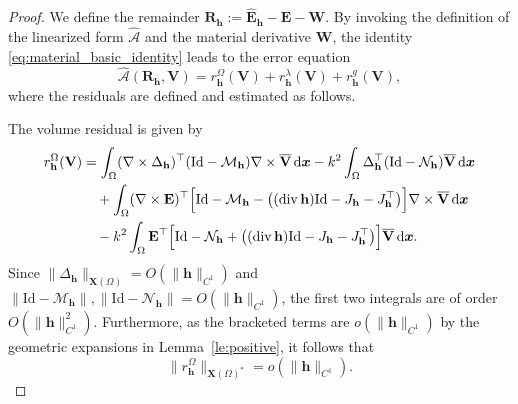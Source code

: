 \documentclass[12pt,reqno]{amsart}
\theoremstyle{definition}
\numberwithin{equation}{section}
\begin{document}
\begin{proof}
We define the remainder $\mathbf{R}_{\mathbf{h}} := \hat{\mathbf{E}}_{\mathbf{h}} - \mathbf{E} - \mathbf{W}$. By invoking the definition of the linearized form $\widehat{\mathcal{A}}$ and the material derivative $\mathbf{W}$, the identity \eqref{eq:material_basic_identity} leads to the error equation
\[
\widehat{\mathcal{A}}(\mathbf{R}_{\mathbf{h}}, \mathbf{V}) = r_{\mathbf{h}}^{\Omega}(\mathbf{V}) + r_{\mathbf{h}}^{\lambda}(\mathbf{V}) + r_{\mathbf{h}}^{g}(\mathbf{V}),
\]
where the residuals are defined and estimated as follows.


The volume residual is given by
\[
\begin{aligned}
r_{\mathbf{h}}^{\Omega}(\mathbf{V}) &= \int_\Omega (\nabla \times \Delta_{\mathbf{h}})^\top (\mathrm{Id} - \mathcal{M}_{\mathbf{h}}) \nabla \times \overline{\mathbf{V}} \,\mathrm{d}\boldsymbol{x} - k^2 \int_\Omega \Delta_{\mathbf{h}}^\top (\mathrm{Id} - \mathcal{N}_{\mathbf{h}}) \overline{\mathbf{V}} \,\mathrm{d}\boldsymbol{x} \\
&\quad + \int_\Omega (\nabla \times \mathbf{E})^\top \Bigl[ \mathrm{Id} - \mathcal{M}_{\mathbf{h}} - \bigl( (\operatorname{div}\mathbf{h})\mathrm{Id} - J_{\mathbf{h}} - J_{\mathbf{h}}^\top \bigr) \Bigr] \nabla \times \overline{\mathbf{V}} \,\mathrm{d}\boldsymbol{x} \\
&\quad - k^2 \int_\Omega \mathbf{E}^\top \Bigl[ \mathrm{Id} - \mathcal{N}_{\mathbf{h}} + \bigl( (\operatorname{div}\mathbf{h})\mathrm{Id} - J_{\mathbf{h}} - J_{\mathbf{h}}^\top \bigr) \Bigr] \overline{\mathbf{V}} \,\mathrm{d}\boldsymbol{x}.
\end{aligned}
\]
Since $\|\Delta_{\mathbf{h}}\|_{\mathbf{X}(\Omega)} = O(\|\mathbf{h}\|_{C^1})$ and $\|\mathrm{Id} - \mathcal{M}_{\mathbf{h}}\|, \|\mathrm{Id} - \mathcal{N}_{\mathbf{h}}\| = O(\|\mathbf{h}\|_{C^1})$, the first two integrals are of order $O(\|\mathbf{h}\|_{C^1}^2)$. Furthermore, as the bracketed terms are $o(\|\mathbf{h}\|_{C^1})$ by the geometric expansions in Lemma~\ref{le:positive}, it follows that
\[
\|r_{\mathbf{h}}^{\Omega}\|_{\mathbf{X}(\Omega)^*} = o(\|\mathbf{h}\|_{C^1}).
\]


\end{proof}
\end{document}
